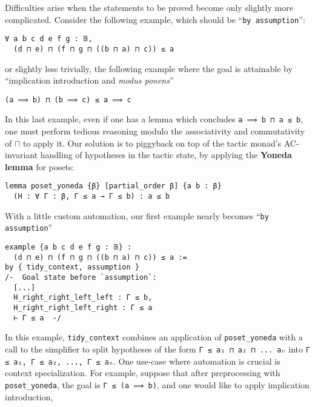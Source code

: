 \documentclass[sigplan,10pt,review, anonymous]{acmart}
\newcommand{\lil}{\lstinline}
\theoremstyle{definition}
\begin{document}
Difficulties arise when the statements to be proved become only slightly more complicated. Consider the following example, which should be  ``\lil{by assumption}'':
\begin{lstlisting}
∀ a b c d e f g : 𝔹,
  (d ⊓ e) ⊓ (f ⊓ g ⊓ ((b ⊓ a) ⊓ c)) ≤ a
\end{lstlisting}
or slightly less trivially, the following example where the goal is attainable by ``implication introduction and \emph{modus ponens}''
\begin{lstlisting}
(a ⟹ b) ⊓ (b ⟹ c) ≤ a ⟹ c
\end{lstlisting}
In this last example, even if one has a lemma which concludes \lil{a ⟹ b ⊓ a ≤ b}, one must perform tedious reasoning modulo the associativity and commutativity of \(\sqcap\) to apply it.
Our solution is to piggyback on top of the tactic monad's AC-invariant handling of hypotheses in the tactic state, by applying the \textbf{Yoneda lemma} for posets:
\label{poset-yoneda}
\begin{lstlisting}
lemma poset_yoneda {β} [partial_order β] {a b : β}
  (H : ∀ Γ : β, Γ ≤ a → Γ ≤ b) : a ≤ b
\end{lstlisting}
With a little custom automation, our first example nearly becomes ``\lil{by assumption}''
\begin{lstlisting}
example {a b c d e f g : 𝔹} :
  (d ⊓ e) ⊓ (f ⊓ g ⊓ ((b ⊓ a) ⊓ c)) ≤ a :=
by { tidy_context, assumption }
/-  Goal state before `assumption`:
  [...]
  H_right_right_left_left : Γ ≤ b,
  H_right_right_left_right : Γ ≤ a
  ⊢ Γ ≤ a  -/
\end{lstlisting}
In this example, \lil{tidy_context} combines an application of \lil{poset_yoneda} with a call to the simplifier to split hypotheses of the form \lstinline{Γ ≤ a₁ ⊓ a₂ ⊓ ... aₙ} into \lstinline{Γ ≤ a₁, Γ ≤ a₂, ..., Γ ≤ aₙ}.
One use-case where automation is crucial is context specialization.
For example, suppose that after preprocessing with \lstinline{poset_yoneda}, the goal is \lstinline{Γ ≤ (a ⟹ b)}, and one would like to apply implication introduction,
\end{document}

